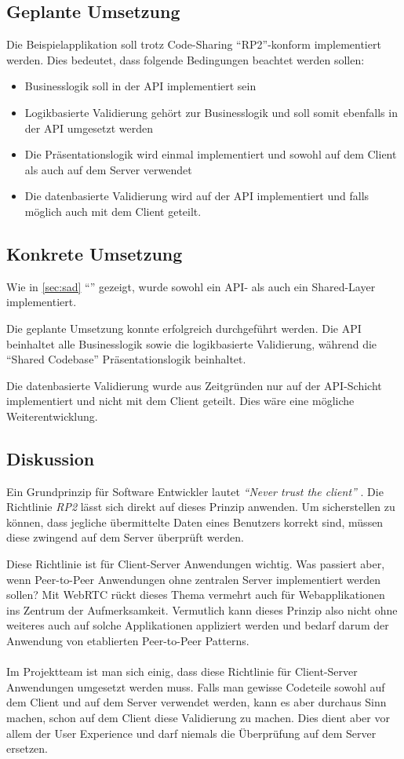 \subsection*{Geplante Umsetzung}
Die Beispielapplikation soll trotz Code-Sharing ``RP2''-konform implementiert werden. Dies bedeutet, dass folgende Bedingungen beachtet werden sollen:
\begin{itemize}
	\item Businesslogik soll in der API implementiert sein
	\item Logikbasierte Validierung gehört zur Businesslogik und soll somit ebenfalls in der API umgesetzt werden
	\item Die Präsentationslogik wird einmal implementiert und sowohl auf dem Client als auch auf dem Server verwendet
	\item Die datenbasierte Validierung wird auf der API implementiert und falls möglich auch mit dem Client geteilt.
\end{itemize}

\subsection*{Konkrete Umsetzung}
Wie in \ref{sec:sad} ``'' gezeigt, wurde sowohl ein API- als auch ein Shared-Layer implementiert.

Die geplante Umsetzung konnte erfolgreich durchgeführt werden. Die API beinhaltet alle Businesslogik sowie die logikbasierte Validierung, während die ``Shared Codebase'' Präsentationslogik beinhaltet.

Die datenbasierte Validierung wurde aus Zeitgründen nur auf der API-Schicht implementiert und nicht mit dem Client geteilt. Dies wäre eine mögliche Weiterentwicklung.

\subsection*{Diskussion}
Ein Grundprinzip für Software Entwickler lautet \emph{``Never trust the client''} \cite{DefensiveProgramming}. Die Richtlinie \emph{RP2} lässt sich direkt auf dieses Prinzip anwenden.
Um sicherstellen zu können, dass jegliche übermittelte Daten eines Benutzers korrekt sind, müssen diese zwingend auf dem Server überprüft werden.

Diese Richtlinie ist für Client-Server Anwendungen wichtig. Was passiert aber, wenn Peer-to-Peer Anwendungen ohne zentralen Server implementiert werden sollen? Mit \mbox{\gls{WebRTC}} \cite{WebRTC} rückt dieses Thema vermehrt auch für Webapplikationen ins Zentrum der Aufmerksamkeit. Vermutlich kann dieses Prinzip also nicht ohne weiteres auch auf solche Applikationen appliziert werden und bedarf darum der Anwendung von etablierten Peer-to-Peer Patterns.
\\ \\
Im Projektteam ist man sich einig, dass diese Richtlinie für Client-Server Anwendungen umgesetzt werden muss. Falls man gewisse Codeteile sowohl auf dem Client und auf dem Server verwendet werden, kann es aber durchaus Sinn machen, schon auf dem Client diese Validierung zu machen. Dies dient aber vor allem der User Experience und darf niemals die Überprüfung auf dem Server ersetzen.